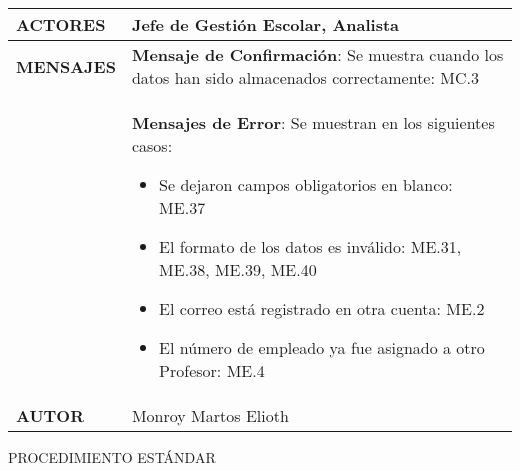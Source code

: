 \begin{longtable}{ | p{6cm} | p{10cm} |}
    \hline
    \textbf{ACTORES} & Jefe de Gestión Escolar, Analista\\
    \hline
    \textbf{MENSAJES}  & \textbf{Mensaje de Confirmación}: Se muestra cuando los datos han sido almacenados correctamente: MC.3\\&\textbf{Mensajes de Error}: Se muestran en los siguientes casos:\begin{itemize}
    	\item Se dejaron campos obligatorios en blanco: ME.37
    	\item El formato de los datos es inválido: ME.31, ME.38, ME.39, ME.40
    	\item El correo está registrado en otra cuenta: ME.2
    	\item El número de empleado ya fue asignado a otro Profesor: ME.4
    \end{itemize}\\
    \hline
    \textbf{AUTOR} & Monroy Martos Elioth\\
    \hline
\end{longtable}
\vspace*{1cm}
\noindent
\Large{PROCEDIMIENTO ESTÁNDAR}
\large{}
